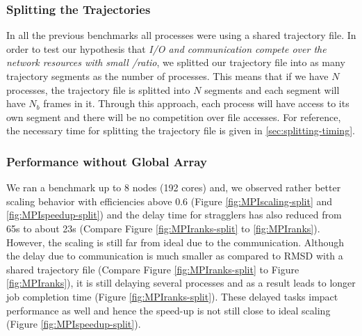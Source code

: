 \subsubsection{Splitting the Trajectories}
\label{splitting-traj}
In all the previous benchmarks all processes were using a shared trajectory file.
In order to test our hypothesis that \emph{I/O and communication compete over the network resources with small \tcomp/\tIO ratio}, we splitted our trajectory file into as many trajectory segments as the number of processes.
This means that if we have $N$ processes, the trajectory file is splitted into $N$ segments and each segment will have $N_{b}$ frames in it. 
Through this approach, each process will have access to its own segment and there will be no competition over file accesses. 
For reference, the necessary time for splitting the trajectory file is given in \ref{sec:splitting-timing}.

\subsubsection*{Performance without Global Array}
We ran a benchmark up to 8 nodes (192 cores) and, we observed rather better scaling behavior with efficiencies above 0.6 (Figure \ref{fig:MPIscaling-split} and \ref{fig:MPIspeedup-split}) and the delay time for stragglers has also reduced from 65s to about 23s (Compare Figure \ref{fig:MPIranks-split} to  \ref{fig:MPIranks}). 
However, the scaling is still far from ideal due to the communication. 
Although the delay due to communication is much smaller as compared to RMSD with a shared trajectory file (Compare Figure \ref{fig:MPIranks-split} to Figure \ref{fig:MPIranks}), it is still delaying several processes and as a result leads to longer job completion time (Figure \ref{fig:MPIranks-split}). 
These delayed tasks impact performance as well and hence the speed-up is not still close to ideal scaling (Figure \ref{fig:MPIspeedup-split}).

